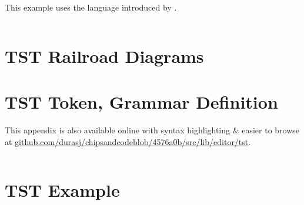 This example uses the language introduced by \textcite{nand2tetris}.

\inputminted[breaklines=true,fontsize=\footnotesize]{text}{./assets/Xor.hdl}

\chapter{TST Railroad Diagrams}
\label{appendix:tst-railroad}

\noindent


\vspace{20pt}

\noindent


\vspace{20pt}

\noindent


\vspace{20pt}

\noindent


\vspace{20pt}

\noindent


\vspace{20pt}

\noindent


\vspace{20pt}

\noindent


\vspace{20pt}

\noindent


\chapter{TST Token, Grammar Definition}
\label{appendix:tst-grammar}

This appendix is also available online with syntax highlighting \& easier to browse at \href{https://github.com/durasj/chipsandcode/blob/4576a0b/src/lib/editor/tst/grammar.ne}{github.com/durasj/chipsandcodeblob/4576a0b/src/lib/editor/tst}.

\inputminted[breaklines=true,fontsize=\footnotesize]{text}{./assets/tst.ne}

\chapter{TST Example}
\label{appendix:tst-example}

